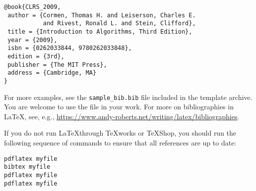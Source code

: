 \documentclass[sigconf, nonacm, natbib, screen, balance=False]{acmart}
\begin{document}
\begin{verbatim}
@book{CLRS_2009,
 author = {Cormen, Thomas H. and Leiserson, Charles E. 
           and Rivest, Ronald L. and Stein, Clifford},
 title = {Introduction to Algorithms, Third Edition},
 year = {2009},
 isbn = {0262033844, 9780262033848},
 edition = {3rd},
 publisher = {The MIT Press},
 address = {Cambridge, MA}
} 
\end{verbatim}

For more examples, see the \verb!sample_bib.bib! file included in the
template archive. You are welcome to use the file in your work. For
more on bibliographies in \LaTeX, see, e.g.,
\url{https://www.andy-roberts.net/writing/latex/bibliographies}.

If you do not run \LaTeX through TeXworks or TeXShop, you should run
the following sequence of commands to ensure that all references are
up to date:

\begin{verbatim}
pdflatex myfile
bibtex myfile
pdflatex myfile 
pdflatex myfile 
\end{verbatim}




\end{document}
